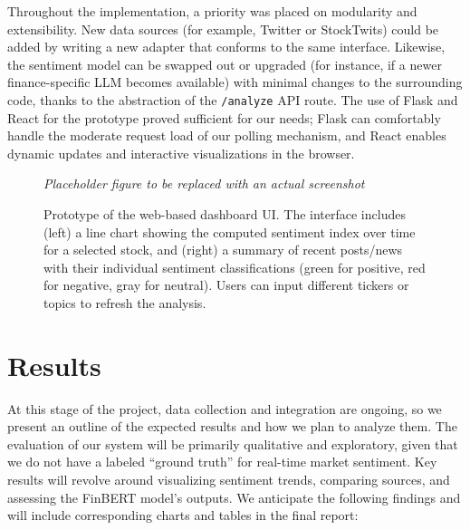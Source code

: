 \documentclass[12pt]{article}
\begin{document}
Throughout the implementation, a priority was placed on modularity and extensibility. New data sources (for
example, Twitter or StockTwits) could be added by writing a new adapter that conforms to the same interface.
Likewise, the sentiment model can be swapped out or upgraded (for instance, if a newer finance-specific LLM
becomes available) with minimal changes to the surrounding code, thanks to the abstraction of the
\texttt{/analyze} API route. The use of Flask and React for the prototype proved sufficient for our needs;
Flask can comfortably handle the moderate request load of our polling mechanism, and React enables dynamic
updates and interactive visualizations in the browser.

\begin{figure}[h]
  \centering
  \textit{Placeholder figure to be replaced with an actual screenshot}
  \caption{Prototype of the web-based dashboard UI. The interface includes (left) a line chart showing the
    computed sentiment index over time for a selected stock, and (right) a summary of recent
    posts/news with their individual sentiment classifications (green for positive, red for negative,
    gray for neutral). Users can input different tickers or topics to refresh the analysis.}
  \label{fig:ui}
\end{figure}


\section{Results}
At this stage of the project, data collection and integration are ongoing, so we present an outline of the
expected results and how we plan to analyze them. The evaluation of our system will be primarily qualitative
and exploratory, given that we do not have a labeled “ground truth” for real-time market sentiment. Key
results will revolve around visualizing sentiment trends, comparing sources, and assessing the FinBERT
model's outputs. We anticipate the following findings and will include corresponding charts and tables in
the final report:
\end{document}
